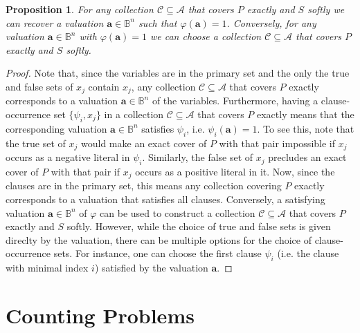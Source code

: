 \documentclass[a4paper]{article}
\newtheorem{proposition}{Proposition}
\renewcommand{\vec}[1]{\boldsymbol{#1}}
\begin{document}
\begin{proposition}
  For any collection $\mathcal{C} \subseteq \mathcal{A}$ that covers $P$
  exactly and $S$ softly we can recover a valuation $\vec{a} \in \mathbb{B}^n$
  such that $\varphi(\vec{a}) = 1$. Conversely, for any valuation $\vec{a} \in
  \mathbb{B}^n$ with $\varphi(\vec{a}) = 1$ we can choose a collection
  $\mathcal{C} \subseteq \mathcal{A}$ that covers $P$ exactly and $S$ softly.
\end{proposition}
\begin{proof}
  Note that, since the variables are in the primary set and the only the true
  and false sets of $x_j$ contain $x_j$, any collection $\mathcal{C} \subseteq
  \mathcal{A}$ that
  covers $P$ exactly corresponds to a valuation $\vec{a} \in \mathbb{B}^n$ of
  the variables. Furthermore, having a clause-occurrence set $\{\psi_i, x_j\}$
  in a collection $\mathcal{C} \subseteq \mathcal{A}$ that covers $P$ exactly means that the
  corresponding valuation $\vec{a} \in \mathbb{B}^n$ satisfies $\psi_i$, i.e.
  $\psi_i(\vec{a}) = 1$. To see this, note that the true set of $x_j$ would make
  an exact cover of $P$ with that pair impossible if $x_j$ occurs as a negative
  literal in $\psi_i$. Similarly, the false set of $x_j$ precludes an exact
  cover of $P$ with that pair if $x_j$ occurs as a positive literal in it.  Now,
  since the clauses are in the primary set, this means any collection covering
  $P$ exactly corresponds to a valuation that satisfies all clauses. Conversely,
  a satisfying valuation $\vec{a} \in \mathbb{B}^n$ of $\varphi$ can be used to
  construct a collection $\mathcal{C} \subseteq \mathcal{A}$ that covers $P$
  exactly and $S$ softly. However, while the choice of true and false sets is given direclty by
  the valuation, there can be multiple options for the choice of
  clause-occurrence sets. For instance, one can choose the first clause $\psi_i$
  (i.e. the clause with minimal index $i$) satisfied by the valuation $\vec{a}$.
\end{proof}


\section{Counting Problems}
\end{document}
